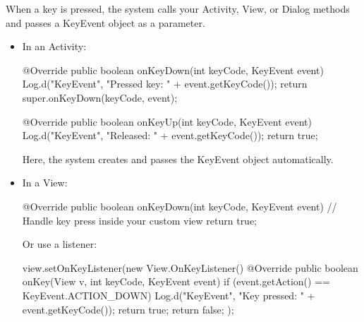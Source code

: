 \documentclass{report}
\begin{document}
\begin{itemize}
            \bigbreak \noindent 
            When a key is pressed, the system calls your Activity, View, or Dialog methods and passes a KeyEvent object as a parameter.
            \begin{itemize}
                \item In an Activity:
                    \bigbreak \noindent 
                    \begin{javacode}
                        @Override
                        public boolean onKeyDown(int keyCode, KeyEvent event) {
                            Log.d("KeyEvent", "Pressed key: " + event.getKeyCode());
                            return super.onKeyDown(keyCode, event);
                        }

                        @Override
                        public boolean onKeyUp(int keyCode, KeyEvent event) {
                            Log.d("KeyEvent", "Released: " + event.getKeyCode());
                            return true;
                        }
                    \end{javacode}
                    \bigbreak \noindent 
                    Here, the system creates and passes the KeyEvent object automatically.
                \item In a View:
                    \bigbreak \noindent 
                    \begin{javacode}
                        @Override
                        public boolean onKeyDown(int keyCode, KeyEvent event) {
                            // Handle key press inside your custom view
                            return true;
                        }
                    \end{javacode}
                    \bigbreak \noindent 
                    Or use a listener:
                    \bigbreak \noindent 
                    \begin{javacode}
                        view.setOnKeyListener(new View.OnKeyListener() {
                            @Override
                            public boolean onKey(View v, int keyCode, KeyEvent event) {
                                if (event.getAction() == KeyEvent.ACTION_DOWN) {
                                    Log.d("KeyEvent", "Key pressed: " + event.getKeyCode());
                                    return true;
                                }
                                return false;
                            }
                        });
                    \end{javacode}


\end{itemize}
\end{itemize}
\end{document}
